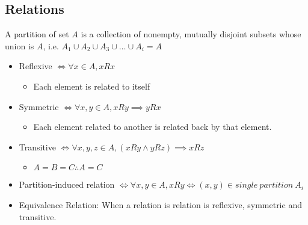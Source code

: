 \documentclass[landscape, letterpaper]{article}
\begin{document}
\begin{multicols}{2}
    \section*{Relations}
    A partition of set $A$ is a collection of nonempty, mutually disjoint subsets whose union is $A$, i.e. $A_1 \cup A_2 \cup A_3 \cup \ldots \cup A_i = A$
    \begin{itemize}
        \item Reflexive $ \iff \forall x \in A, x R x$
              \begin{itemize}
                  \item Each element is related to itself
              \end{itemize}
        \item Symmetric $ \iff \forall x, y \in A, x R y \implies y R x$
              \begin{itemize}
                  \item Each element related to another is related back by that element.
              \end{itemize}
        \item Transitive $\iff \forall x, y, z \in A, (x R y \land y R z)\implies x R z$
              \begin{itemize}
                  \item $A = B = C \therefore A=C$
              \end{itemize}
        \item Partition-induced relation $\iff \forall x, y \in A, x R y \iff (x, y) \in single~partition~A_i$
        \item Equivalence Relation: When a relation is relation is reflexive, symmetric and transitive.
    \end{itemize}


\end{multicols}
\end{document}

